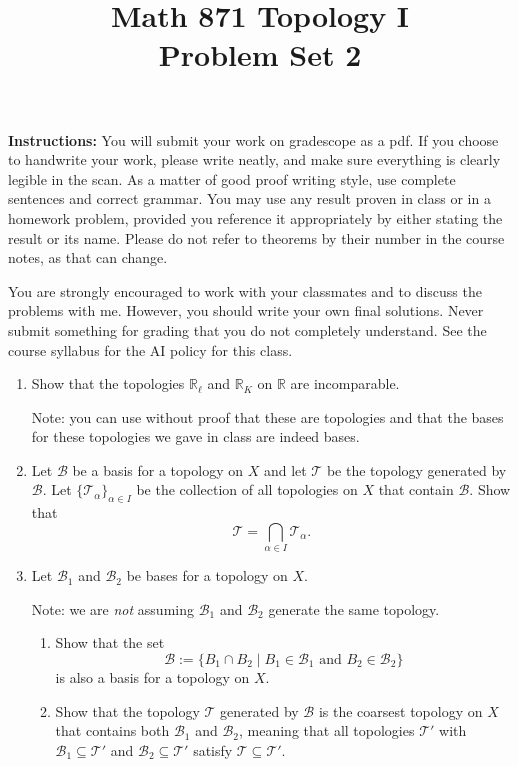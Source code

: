 \documentclass[12pt]{article}
\title{Math 871 Topology I\\[-0.1em]
\large Problem Set 2}
\author{}
\date{}
\newcommand{\R}{\mathbb{R}}
\newcommand{\T}{\mathcal{T}}
\newcommand{\B}{\mathscr{B}}
\begin{document}
\maketitle


	
\thispagestyle{fancy}
\pagestyle{fancy}





{\bf Instructions:}
You will submit your work on gradescope as a pdf. If you choose to handwrite your work, please write neatly, and make sure everything is clearly legible in the scan.
As a matter of good proof writing style, use complete sentences and correct grammar. You may use any result proven in class or in a homework problem, provided you reference it appropriately by either stating the result or its name. Please do not refer to theorems by their number in the course notes, as that can change.

You are strongly encouraged to work with your classmates and to discuss the problems with me. However, you should write your own final solutions.
Never submit something for grading that you do not completely understand. 
See the course syllabus for the AI policy for this class.
	
\vspace{2em}

\begin{enumerate}[roomy]


\item Show that the topologies $\R_{\ell}$ and $\R_K$ on $\R$ are incomparable.

\noindent
Note: you can use without proof that these are topologies and that the bases for these topologies we gave in class are indeed bases.

\item Let $\B$ be a basis for a topology on $X$ and let $\T$ be the topology generated by $\B$. Let $\{\T_\alpha \}_{\alpha \in I}$ be the collection of all topologies on $X$ that contain $\B$.
Show that
\[ \T = \bigcap_{\alpha \in I} \T_\alpha.\]


\item Let $\B_1$ and $\B_2$ be bases for a topology on $X$.

\noindent
Note: we are \emph{not} assuming $\B_1$ and $\B_2$ generate the same topology.


\begin{enumerate}
\item Show that the set
\[ \B := \{B_1 \cap B_2 \mid B_1 \in \B_1 \text{ and } B_2 \in \B_2 \}\]
is also a basis for a topology on $X$.


\item Show that the topology $\T$ generated by $\B$ is the coarsest topology on $X$ that contains both $\B_1$ and $\B_2$, meaning that all topologies $\T'$ with $\B_1 \subseteq \T'$ and $\B_2 \subseteq \T'$ satisfy $\T \subseteq \T'$.
\end{enumerate}

\end{enumerate}
\end{document}
